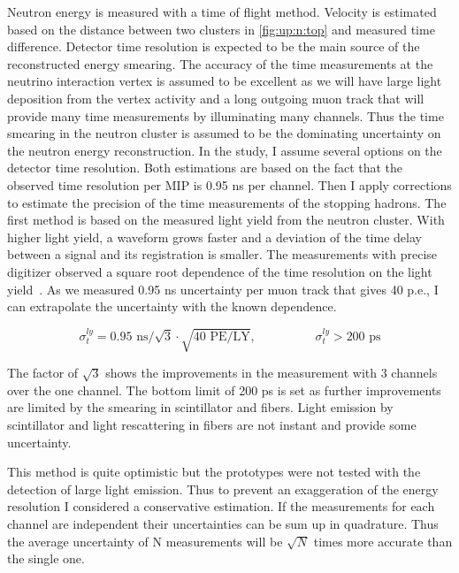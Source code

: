 \documentclass[main.tex]{subfiles}
\begin{document}
Neutron energy is measured with a time of flight method. Velocity is estimated based on the distance between two clusters in \autoref{fig:up:n:top} and measured time difference. Detector time resolution is expected to be the main source of the reconstructed energy smearing. The accuracy of the time measurements at the neutrino interaction vertex is assumed to be excellent as we will have large light deposition from the vertex activity and a long outgoing muon track that will provide many time measurements by illuminating many channels. Thus the time smearing in the neutron cluster is assumed to be the dominating uncertainty on the neutron energy reconstruction. In the study, I assume several options on the detector time resolution. Both estimations are based on the fact that the observed time resolution per MIP is 0.95 ns per channel. Then I apply corrections to estimate the precision of the time measurements of the stopping hadrons. The first method is based on the measured light yield from the neutron cluster. With higher light yield, a waveform grows faster and a deviation of the time delay between a signal and its registration is smaller. The measurements with precise digitizer observed a square root dependence of the time resolution on the light yield~\cite{Niemann2010}. As we measured 0.95 ns uncertainty per muon track that gives 40 p.e., I can extrapolate the uncertainty with the known dependence.

\begin{equation}
\label{eq:up:n:ly}
	\sigma^{ly}_t=0.95\text{ ns}/\sqrt{3}\cdot\sqrt{40 \text{ PE/LY}}, \hspace{2cm} \sigma^{ly}_t>200\text{ ps}
\end{equation}

The factor of $\sqrt{3}$ shows the improvements in the measurement with 3 channels over the one channel. The bottom limit of 200 ps is set as further improvements are limited by the smearing in scintillator and fibers. Light emission by scintillator and light rescattering in fibers are not instant and provide some uncertainty.

This method is quite optimistic but the prototypes were not tested with the detection of large light emission. Thus to prevent an exaggeration of the energy resolution I considered a conservative estimation. If the measurements for each channel are independent their uncertainties can be sum up in quadrature. Thus the average uncertainty of N measurements will be $\sqrt{N}$ times more accurate than the single one.
\end{document}
